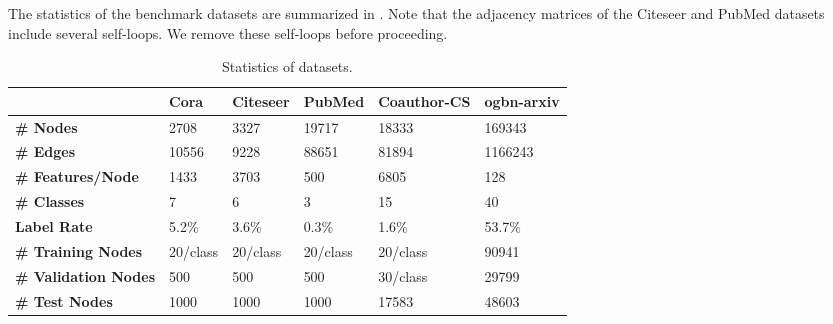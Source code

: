 \documentclass[lettersize,journal]{IEEEtran}
\theoremstyle{plain}
\theoremstyle{definition}
\theoremstyle{remark}
\begin{document}
The statistics of the benchmark datasets are summarized in . Note that the adjacency matrices of the Citeseer and PubMed datasets include several self-loops. We remove these self-loops before proceeding.

\begin{table*}[t]
	\caption{Statistics of datasets.}
	\label{tb:datasets}
	\begin{center}
			\begin{tabular}{llllll}
				\toprule
				\textbf{} &\textbf{Cora} &\textbf{Citeseer} &\textbf{PubMed} &\textbf{Coauthor-CS} &\textbf{ogbn-arxiv}\\
				\midrule
				\textbf{\# Nodes}           &2708  &3327  &19717  &18333 &169343\\
				\textbf{\# Edges}           &10556  &9228  &88651  &81894 &1166243\\
				\textbf{\# Features/Node}   &1433 &3703  &500  &6805  &128\\
				\textbf{\# Classes}         &7 &6  &3  &15  &40\\
				\textbf{Label Rate}      &5.2\%  &3.6\%  &0.3\%  &1.6\%  &53.7\%\\
				\textbf{\# Training Nodes}        &20/class &20/class  &20/class  &20/class  &90941\\
				\textbf{\# Validation Nodes}      &500  &500  &500  &30/class   &29799\\
				\textbf{\# Test Nodes}            &1000  &1000  &1000  &17583  &48603\\
				\bottomrule
			\end{tabular}
	\end{center}
\end{table*}
\end{document}
